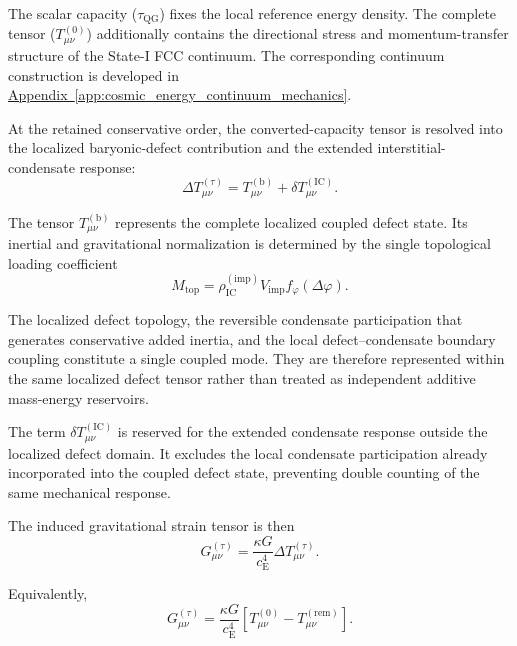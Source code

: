 The scalar capacity ($\tau_{\mathrm{QG}}$) fixes the local reference energy density. The complete tensor ($T_{\mu\nu}^{(0)}$) additionally contains the directional stress and momentum-transfer structure of the State-I FCC continuum. The corresponding continuum construction is developed in \hyperref[app:cosmic_energy_continuum_mechanics]{Appendix~\ref*{app:cosmic_energy_continuum_mechanics}}.

At the retained conservative order, the converted-capacity tensor is resolved into the localized baryonic-defect contribution and the extended interstitial-condensate response:
\begin{equation}
    \Delta T_{\mu\nu}^{(\tau)} = T_{\mu\nu}^{(\mathrm{b})} + \delta T_{\mu\nu}^{(\mathrm{IC})}.
\end{equation}

The tensor $T_{\mu\nu}^{(\mathrm{b})}$ represents the complete localized coupled defect state. Its inertial and gravitational normalization is determined by the single topological loading coefficient
\begin{equation}
    M_{\mathrm{top}} = \rho_{\mathrm{IC}}^{(\mathrm{imp})} V_{\mathrm{imp}} f_{\varphi}(\Delta\varphi).
\end{equation}

The localized defect topology, the reversible condensate participation that generates conservative added inertia, and the local defect--condensate boundary coupling constitute a single coupled mode. They are therefore represented within the same localized defect tensor rather than treated as independent additive mass-energy reservoirs.

The term $\delta T_{\mu\nu}^{(\mathrm{IC})}$ is reserved for the extended condensate response outside the localized defect domain. It excludes the local condensate participation already incorporated into the coupled defect state, preventing double counting of the same mechanical response.

The induced gravitational strain tensor is then
\begin{equation}
    G_{\mu\nu}^{(\tau)} = \frac{\kappa G}{c_{\mathrm{E}}^4} \Delta T_{\mu\nu}^{(\tau)}.
\end{equation}

Equivalently,
\begin{equation}
    G_{\mu\nu}^{(\tau)} = \frac{\kappa G}{c_{\mathrm{E}}^4} \left[ T_{\mu\nu}^{(0)} - T_{\mu\nu}^{(\mathrm{rem})} \right].
\end{equation}

